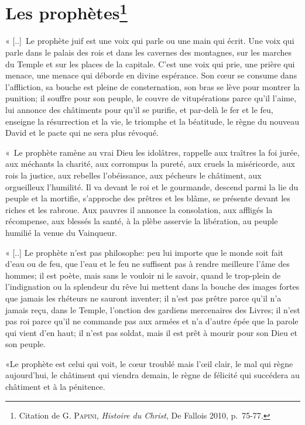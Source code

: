 \section*{Les prophètes\footnote{Citation de \textsc{G. Papini}, \textit{Histoire du Christ}, De Fallois 2010, p.~75-77.}}
\decalage « [..]~Le prophète juif est une voix qui parle ou une main qui écrit. Une voix qui parle dans le palais des rois et dans les cavernes des montagnes, sur les marches du Temple et sur les places de la capitale. C'est une voix qui prie, une prière qui menace, une menace qui déborde en divine espérance. Son cœur se consume dans l'affliction, sa bouche est pleine de consternation, son bras se lève pour montrer la punition; il souffre pour son peuple, le couvre de vitupérations parce qu'il l'aime, lui annonce des châtiments pour qu'il se purifie, et par-delà le fer et le feu, enseigne la résurrection et la vie, le triomphe et la béatitude, le règne du nouveau David et le pacte qui ne sera plus révoqué.\par
\decalage «~Le prophète ramène au vrai Dieu les idolâtres, rappelle aux traîtres la foi jurée, aux méchants la charité, aux corrompus la pureté, aux cruels la miséricorde, aux rois la justice, aux rebelles l'obéissance, aux pécheurs le châtiment, aux orgueilleux l'humilité. Il va devant le roi et le gourmande, descend parmi la lie du peuple et la mortifie, s'approche des prêtres et les blâme, se présente devant les riches et les rabroue. Aux pauvres il annonce la consolation, aux affligés la récompense, aux blessés la santé, à la plèbe asservie la libération, au peuple humilié la venue du Vainqueur.\par
\decalage « [..] Le prophète n'est pas philosophe: peu lui importe que le monde soit fait d'eau ou de feu, que l'eau et le feu ne suffisent pas à rendre meilleure l'âme des hommes; il est poète, mais sans le vouloir ni le savoir, quand le trop-plein de l'indignation ou la splendeur du rêve lui mettent dans la bouche des images fortes que jamais les rhéteurs ne sauront inventer; il n'est pas prêtre parce qu'il n'a jamais reçu, dans le Temple, l'onction des gardiens mercenaires des Livres; il n'est pas roi parce qu'il ne commande pas aux armées et n'a d'autre épée que la parole qui vient d'en haut; il n'est pas soldat, mais il est prêt à mourir pour son Dieu et son peuple. \par
\decalage «Le prophète est celui qui voit, le cœur troublé mais l'œil clair, le mal qui règne aujourd'hui, le châtiment qui viendra demain, le règne de félicité qui succédera au châtiment et à la pénitence.\par
